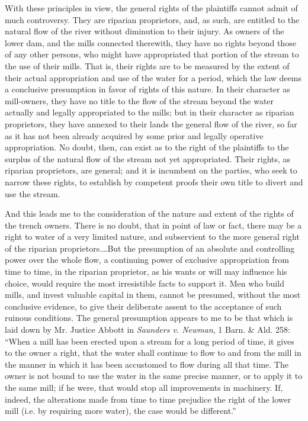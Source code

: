 With these principles in view, the general rights of the plaintiffs cannot admit
of much controversy. They are riparian proprietors, and, as such, are entitled
to the natural flow of the river without diminution to their injury. As owners
of the lower dam, and the mills connected therewith, they have no rights beyond
those of any other persons, who might have appropriated that portion of the
stream to the use of their mills. That is, their rights are to be measured by
the extent of their actual appropriation and use of the water for a period,
which the law deems a conclusive presumption in favor of rights of this nature.
In their character as mill-owners, they have no title to the flow of the stream
beyond the water actually and legally appropriated to the mills; but in their
character as riparian proprietors, they have annexed to their lands the general
flow of the river, so far as it has not been already acquired by some prior and
legally operative appropriation. No doubt, then, can exist as to the right of
the plaintiffs to the surplus of the natural flow of the stream not yet
appropriated. Their rights, as riparian proprietors, are general; and it is
incumbent on the parties, who seek to narrow these rights, to establish by
competent proofs their own title to divert and use the stream.

And this leads me to the consideration of the nature and extent of the rights of
the trench owners. There is no doubt, that in point of law or fact, there may be
a right to water of a very limited nature, and subservient to the more general
right of the riparian proprietors.\ldots But the presumption of an absolute and
controlling power over the whole flow, a continuing power of exclusive
appropriation from time to time, in the riparian proprietor, as his wants or
will may influence his choice, would require the most irresistible facts to
support it. Men who build mills, and invest valuable capital in them, cannot be
presumed, without the most conclusive evidence, to give their deliberate assent
to the acceptance of such ruinous conditions. The general presumption appears to
me to be that which is laid down by Mr. Justice Abbott in \emph{Saunders v.
Newman}, 1 Barn. \& Ald. 258: ``When a mill has been erected upon a stream for a
long period of time, it gives to the owner a right, that the water shall
continue to flow to and from the mill in the manner in which it has been
accustomed to flow during all that time. The owner is not bound to use the water
in the same precise manner, or to apply it to the same mill; if he were, that
would stop all improvements in machinery. If, indeed, the alterations made from
time to time prejudice the right of the lower mill (i.e. by requiring more
water), the case would be different.''

